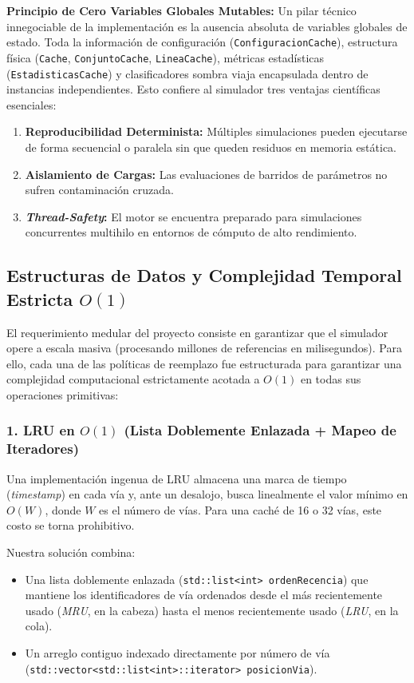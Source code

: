 \documentclass[11pt,letterpaper]{article}
\begin{document}
\noindent\textbf{Principio de Cero Variables Globales Mutables:}
Un pilar técnico innegociable de la implementación es la ausencia absoluta de variables globales de estado. Toda la información de configuración (\texttt{ConfiguracionCache}), estructura física (\texttt{Cache}, \texttt{ConjuntoCache}, \texttt{LineaCache}), métricas estadísticas (\texttt{EstadisticasCache}) y clasificadores sombra viaja encapsulada dentro de instancias independientes. Esto confiere al simulador tres ventajas científicas esenciales:
\begin{enumerate}
    \item \textbf{Reproducibilidad Determinista:} Múltiples simulaciones pueden ejecutarse de forma secuencial o paralela sin que queden residuos en memoria estática.
    \item \textbf{Aislamiento de Cargas:} Las evaluaciones de barridos de parámetros no sufren contaminación cruzada.
    \item \textbf{\textit{Thread-Safety}:} El motor se encuentra preparado para simulaciones concurrentes multihilo en entornos de cómputo de alto rendimiento.
\end{enumerate}

\subsection{Estructuras de Datos y Complejidad Temporal Estricta \texorpdfstring{$O(1)$}{O(1)}}
El requerimiento medular del proyecto consiste en garantizar que el simulador opere a escala masiva (procesando millones de referencias en milisegundos). Para ello, cada una de las políticas de reemplazo fue estructurada para garantizar una complejidad computacional estrictamente acotada a \textbf{$O(1)$} en todas sus operaciones primitivas:

\subsubsection{1. LRU en \texorpdfstring{$O(1)$}{O(1)} (Lista Doblemente Enlazada + Mapeo de Iteradores)}
Una implementación ingenua de LRU almacena una marca de tiempo (\textit{timestamp}) en cada vía y, ante un desalojo, busca linealmente el valor mínimo en $O(W)$, donde $W$ es el número de vías. Para una caché de 16 o 32 vías, este costo se torna prohibitivo.

Nuestra solución combina:
\begin{itemize}
    \item Una lista doblemente enlazada (\texttt{std::list<int> ordenRecencia}) que mantiene los identificadores de vía ordenados desde el más recientemente usado (\textit{MRU}, en la cabeza) hasta el menos recientemente usado (\textit{LRU}, en la cola).
    \item Un arreglo contiguo indexado directamente por número de vía (\texttt{std::vector<std::list<int>::iterator> posicionVia}).
\end{itemize}
\end{document}

